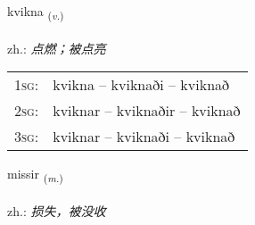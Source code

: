 \documentclass[frontgrid, backgrid]{flacards}\usepackage[]{graphicx}\usepackage[]{xcolor}
\begin{document}
\renewcommand{\flhead}{\vskip5pt \fboxsep=0pt {\small\bfseries\footnotesize Sagnorð | 动词}}
\renewcommand{\fcfoot}{\vskip5pt \fboxsep=0pt \hspace{2pt}{\small\bfseries\footnotesize 3K}}

\renewcommand{\blhead}{\vskip5pt {\small\bfseries\footnotesize Sagnorð | 动词 }}
\renewcommand{\bcfoot}{\vskip5pt \hspace{2pt}{\small\bfseries\footnotesize 3K}}


{kvikna \small{\textsubscript{(\textit{v.})}} \\[1ex] %
\textphonetic{[kʰvɪhkna]} \\
zh.: \emph{点燃；被点亮} \\  [2ex]
\renewcommand*{\arraystretch}{0.8}
\begin{tabular}{p{1cm}l}
\textsc{1sg}: & kvikna -- kviknaði -- kviknað \\ 
\textsc{2sg}: & kviknar -- kviknaðir -- kviknað \\ 
\textsc{3sg}: & kviknar -- kviknaði -- kviknað \\ 
\end{tabular}
}

\renewcommand{\flhead}{\vskip5pt \fboxsep=0pt {\small\bfseries\footnotesize Nafnorð | 名词}}
\renewcommand{\fcfoot}{\vskip5pt \fboxsep=0pt \hspace{2pt}{\small\bfseries\footnotesize 3K}}

\renewcommand{\blhead}{\vskip5pt {\small\bfseries\footnotesize Nafnorð | 名词 }}
\renewcommand{\bcfoot}{\vskip5pt \hspace{2pt}{\small\bfseries\footnotesize 3K}}


{missir \small{\textsubscript{(\textit{m.})}} \\[1ex] %
\textphonetic{[mɪsɪr]} \\
zh.: \emph{损失，被没收} \\  [2ex]
\renewcommand*{\arraystretch}{0.8}
}
\end{document}
